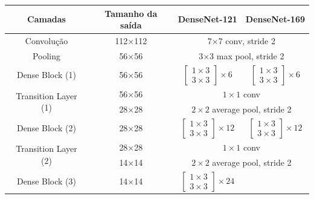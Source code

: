 
\begin{table}[h]
    \centering
    \footnotesize
    \begin{tabular}{|c|c|c|c|}
        \hline
        \textbf{Camadas} & \textbf{Tamanho da saída} & \textbf{DenseNet-121} & \textbf{DenseNet-169} \\
        \hline
        Convolução & 112×112 & \multicolumn{2}{c|}{7×7 conv, stride 2} \\
        \hline
        Pooling & 56×56 & \multicolumn{2}{c|}{3×3 max pool, stride 2} \\
        \hline
        Dense Block (1) & 56×56 & 
        $\left[\begin{array}{c}
        1 \times 3 \\
        3 \times 3
        \end{array}\right] \times 6$ & 
        $\left[\begin{array}{c}
        1 \times 3 \\
        3 \times 3
        \end{array}\right] \times 6$ \\
        \hline
        \multirow{2}{*}{Transition Layer (1)} & 56×56 & \multicolumn{2}{c|}{$1 \times 1$ conv} \\
        \cline{2-4}
        & 28×28 & \multicolumn{2}{c|}{$2 \times 2$ average pool, stride 2} \\
        \hline
        Dense Block (2) & 28×28 & 
        $\left[\begin{array}{c}
        1 \times 3 \\
        3 \times 3
        \end{array}\right] \times 12$ & 
        $\left[\begin{array}{c}
        1 \times 3 \\
        3 \times 3
        \end{array}\right] \times 12$ \\
        \hline
        \multirow{2}{*}{Transition Layer (2)} & 28×28 & \multicolumn{2}{c|}{$1 \times 1$ conv} \\
        \cline{2-4}
        & 14×14 & \multicolumn{2}{c|}{$2 \times 2$ average pool, stride 2} \\
        \hline
        Dense Block (3) & 14×14 & 
        $\left[\begin{array}{c}
        1 \times 3 \\
        3 \times 3
        \end{array}\right] \times 24$ & 

\end{tabular}
\end{table}
